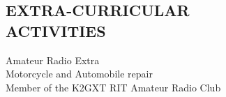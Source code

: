 \documentclass[line,margin]{res}
\begin{document}
\begin{resume}
\section{EXTRA-CURRICULAR \\ ACTIVITIES}             
	Amateur Radio Extra\\
	Motorcycle and Automobile repair\\
	Member of the K2GXT RIT Amateur Radio Club\\


\end{resume}
\end{document}
